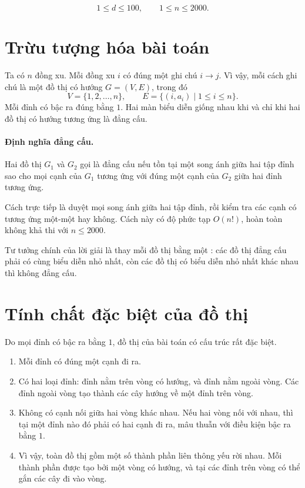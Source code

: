 \documentclass[11pt]{article}
\begin{document}
\[
  1\le d\le 100,\qquad 1\le n\le 2000.
\]

\section{Trừu tượng hóa bài toán}

Ta có \(n\) đồng xu. Mỗi đồng xu \(i\) có đúng một ghi chú \(i\to j\). Vì vậy,
mỗi cách ghi chú là một đồ thị có hướng \(G=(V,E)\), trong đó
\[
  V=\{1,2,\ldots,n\},\qquad
  E=\{(i,a_i)\mid 1\le i\le n\}.
\]
Mỗi đỉnh có bậc ra đúng bằng \(1\). Hai màn biểu diễn giống nhau khi và chỉ
khi hai đồ thị có hướng tương ứng là đẳng cấu.

\paragraph{Định nghĩa đẳng cấu.}
Hai đồ thị \(G_1\) và \(G_2\) gọi là đẳng cấu nếu tồn tại một song ánh giữa hai
tập đỉnh sao cho mọi cạnh của \(G_1\) tương ứng với đúng một cạnh của \(G_2\)
giữa hai đỉnh tương ứng.

Cách trực tiếp là duyệt mọi song ánh giữa hai tập đỉnh, rồi kiểm tra các cạnh
có tương ứng một-một hay không. Cách này có độ phức tạp \(O(n!)\), hoàn toàn
không khả thi với \(n\le 2000\).

Tư tưởng chính của lời giải là thay mỗi đồ thị bằng một : các đồ thị đẳng cấu phải có cùng biểu diễn nhỏ nhất, còn các đồ thị có
biểu diễn nhỏ nhất khác nhau thì không đẳng cấu.

\section{Tính chất đặc biệt của đồ thị}

Do mọi đỉnh có bậc ra bằng \(1\), đồ thị của bài toán có cấu trúc rất đặc
biệt.

\begin{enumerate}
  \item Mỗi đỉnh có đúng một cạnh đi ra.
  \item Có hai loại đỉnh: đỉnh nằm trên vòng có hướng, và đỉnh nằm ngoài vòng.
  Các đỉnh ngoài vòng tạo thành các cây hướng về một đỉnh trên vòng.
  \item Không có cạnh nối giữa hai vòng khác nhau. Nếu hai vòng nối với nhau,
  thì tại một đỉnh nào đó phải có hai cạnh đi ra, mâu thuẫn với điều kiện bậc
  ra bằng \(1\).
  \item Vì vậy, toàn đồ thị gồm một số thành phần liên thông yếu rời nhau. Mỗi
  thành phần được tạo bởi một vòng có hướng, và tại các đỉnh trên vòng có thể
  gắn các cây đi vào vòng.
\end{enumerate}
\end{document}
